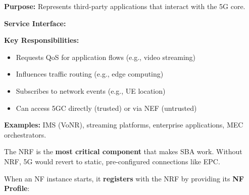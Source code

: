 
\textbf{Purpose:} Represents third-party applications that interact with the 5G core.

\textbf{Service Interface:} 

\textbf{Key Responsibilities:}

\begin{itemize}
\tightlist
\item
  Requests QoS for application flows (e.g., video streaming)
\item
  Influences traffic routing (e.g., edge computing)
\item
  Subscribes to network events (e.g., UE location)
\item
  Can access 5GC directly (trusted) or via NEF (untrusted)
\end{itemize}

\textbf{Examples:} IMS (VoNR), streaming platforms, enterprise applications, MEC orchestrators.


The NRF is the \textbf{most critical component} that makes SBA work. Without NRF, 5G would revert to static, pre-configured connections like EPC.


When an NF instance starts, it \textbf{registers} with the NRF by providing its \textbf{NF Profile}:


